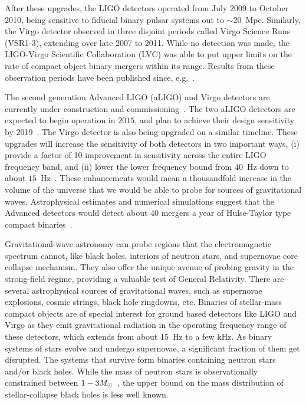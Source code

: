 After these upgrades, the LIGO detectors operated from July 2009
to October 2010, being sensitive to fiducial binary pulsar systems out to 
$\sim 20$~Mpc. 
Similarly, the Virgo detector observed in three disjoint periods called Virgo 
Science Runs (VSR1-3), extending over late 2007 to 2011.
While no detection was made, the LIGO-Virgo Scientific Collaboration
(LVC) was able to put upper limits on the rate of compact object binary mergers
within its range. Results from these observation periods have been published 
since, e.g.~\cite{Messaritaki:2005wv,Abadie:2010mt,Abadie:2012rq,Abbott:2009km,
Colaboration:2011nz,Abadie:2010yb,Abbott:2009qj,Abbott:2009tt,Abadie:2011kd,
Aasi:2012rja,Abbott:2003yq,Abbott:2005pu,Sintes:2005fp,Abadie:2011md,
Palomba:2012wn}. 

The second generation Advanced LIGO (aLIGO) and Virgo detectors are currently
under construction and commissioning~\cite{Harry:2010zz,aVIRGO}.
The two aLIGO detectors are expected to begin operation in $2015$, and
plan to achieve their design sensitivity by 2019~\cite{Aasi:2013wya}. 
The Virgo detector is also being upgraded on a similar timeline. 
These upgrades will increase the sensitivity of both detectors in two 
important ways, (i) provide a factor of 10 improvement in sensitivity 
across the entire LIGO frequency band, and (ii) lower the lower frequency
bound from $40$~Hz down to about $15$~Hz~\cite{Harry:2010zz}. 
These enhancements would mean a thousandfold increase in the volume of the
universe that we would be able to probe for sources of gravitational waves. 
Astrophysical estimates and numerical simulations suggest that the Advanced
detectors would detect about 40 mergers a year of Hulse-Taylor type compact
binaries~\cite{LSCCBCRates2010}. 


Gravitational-wave astronomy can probe regions that the electromagnetic
spectrum cannot, like black holes, interiors of neutron stars, and 
supernovae core collapse mechanism.
They also offer the unique avenue of probing gravity in 
the strong-field regime, providing a valuable test of General Relativity.
There are several astrophysical sources of gravitational waves, such as 
supernovae explosions, cosmic strings, black hole ringdowns, etc. 
Binaries of stellar-mass compact objects are of special interest for 
ground based detectors like LIGO and Virgo as they emit gravitational 
radiation in the operating frequency range of these detectors, which
extends from about 15~Hz to a few kHz. As binary systems of 
stars evolve and undergo supernovae, a significant 
fraction of them get disrupted. The systems that survive form binaries
containing neutron stars and/or black holes. While the mass of neutron
stars is observationally constrained between 
$1-3M_\odot$~\cite{2013ApJ...778...66K,Freire:2011}, the upper bound on the
mass distribution of stellar-collapse black holes is less well known. 

